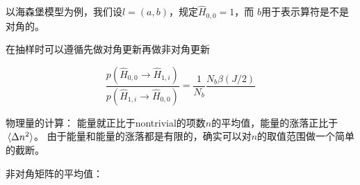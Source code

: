 \documentclass[hyperref, UTF8, a4paper]{ctexart}
\begin{document}
以海森堡模型为例，我们设$l=(a, b)$，规定$\hat{H}_{0, 0} = 1$，而
$b$用于表示算符是不是对角的。

在抽样时可以遵循先做对角更新再做非对角更新

\begin{equation}
    \frac{p(\hat{H}_{0,0} \to \hat{H}_{1, i})}{p(\hat{H}_{1, i} \to \hat{H}_{0, 0})} = \frac{1}{N_b} \frac{N_b \beta (J/2)}{}
\end{equation}

物理量的计算：
能量就正比于nontrivial的项数$n$的平均值，能量的涨落正比于$\expval*{\Delta n^2}$。
由于能量和能量的涨落都是有限的，确实可以对$n$的取值范围做一个简单的截断。

非对角矩阵的平均值：
\end{document}
